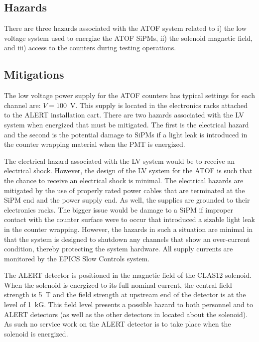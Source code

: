 \subsection{Hazards}

There are three hazards associated with the ATOF system related to i) the low voltage system used
to energize the ATOF SiPMs, ii) the solenoid magnetic field, and iii) access to the counters during
testing operations.

\subsection{Mitigations}

The low voltage power supply for the ATOF counters has typical settings for each channel are: $V=100$~V.
This supply is located in the electronics racks attached to the ALERT installation cart. There are two
hazards associated with the LV system when energized that must be mitigated. The first is the electrical
hazard and the second is the potential damage to SiPMs if a light leak is introduced in the counter
wrapping material when the PMT is energized.

The electrical hazard associated with the LV system would be to receive an electrical shock. However, the
design of the LV system for the ATOF is such that the chance to receive an electrical shock is minimal.
The electrical hazards are mitigated by the use of properly rated power cables that are terminated at the
SiPM end and the power supply end. As well, the supplies are grounded to their electronics racks. The bigger
issue would be damage to a SiPM if improper contact with the counter surface were to occur that introduced 
a sizable light leak in the counter wrapping. However, the hazards in such a situation are minimal in that
the system is designed to shutdown any channels that show an over-current condition, thereby protecting the
system hardware. All supply currents are monitored by the EPICS Slow Controls system.

The ALERT detector is positioned in the magnetic field of the CLAS12 solenoid. When the solenoid is
energized to its full nominal current, the central field strength is 5~T and the field strength at
upstream end of the detector is at the level of 1~kG. This field level presents a possible hazard to
both personnel and to ALERT detectors (as well as the other detectors in located about the solenoid).
As such no service work on the ALERT detector is to take place when the solenoid is energized.

